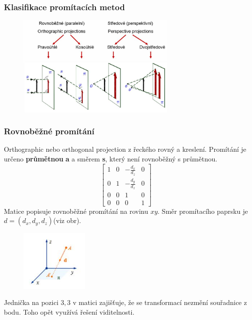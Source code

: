 \subsubsection{Klasifikace promítacích metod}
\begin{figure}[H]
\centering
\includegraphics[width=0.7\textwidth]{assets/2_klas_promitani}
\end{figure}

\subsubsection{Rovnoběžné promítání}
Orthographic nebo orthogonal projection z řeckého  rovný a  kreslení. Promítání je určeno \textbf{průmětnou} \textbf{a} a směrem \textbf{s}, který není rovnoběžný s průmětnou.
\begin{equation*}
			 \begin{bmatrix}
			     1 & 0 & -\frac{d_x}{d_z} & 0       \\[0.3em]
    			 0 & 1 & -\frac{d_y}{d_z} & 0       \\[0.3em]
     			 0 & 0 & 1 & 0 	\\[0.3em]
     			 0 & 0 & 0 & 1       
			  \end{bmatrix}
		\end{equation*}
Matice popisuje rovnoběžné promítání na rovinu $xy$. Směr promítacího paprsku je $d = (d_x, d_y, d_z)$(viz obr).
\begin{figure}[H]
\centering
\includegraphics[width=0.3\textwidth]{assets/2_overeni_rovnobezneho_promitani}
\end{figure}
Jednička na pozici $3,3$ v matici zajišťuje, že se transformací nezmění souřadnice z bodu. Toho opět využívá řešení viditelnosti.


